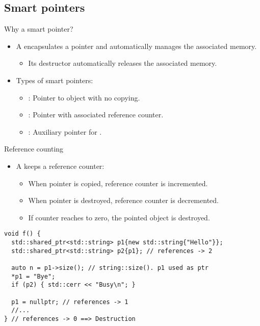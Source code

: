 \subsection{Smart pointers}

\begin{frame}[t]{Why a smart pointer?}
\begin{itemize}
  \item A  encapsulates a pointer and 
        automatically manages the associated memory.
    \begin{itemize}
      \item Its destructor automatically releases the associated memory.
    \end{itemize}

  \vfill\pause
  \item Types of smart pointers:
    \begin{itemize}
      \item {}: Pointer to object with no copying.
      \item {}: Pointer with associated reference counter.
      \item {}: Auxiliary pointer for .
    \end{itemize}
\end{itemize}
\end{frame}


\begin{frame}[t,fragile]{Reference counting}
\begin{itemize}
  \item A  keeps a reference counter:
    \begin{itemize}
      \item When pointer is copied, reference counter is incremented.
      \item When pointer is destroyed, reference counter is decremented.
      \item If counter reaches to zero, the pointed object is destroyed.
    \end{itemize}
\end{itemize}

\begin{lstlisting}
void f() {
  std::shared_ptr<std::string> p1{new std::string{"Hello"}};
  std::shared_ptr<std::string> p2{p1}; // references -> 2

  auto n = p1->size(); // string::size(). p1 used as ptr
  *p1 = "Bye";
  if (p2) { std::cerr << "Busy\n"; }

  p1 = nullptr; // references -> 1
  //...
} // references -> 0 ==> Destruction
\end{lstlisting}

\end{frame}


